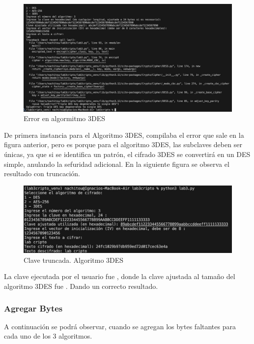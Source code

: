 \documentclass[letter,12pt]{article}
\begin{document}
\begin{figure}[H]
    \centering
    \includegraphics[width=0.9\linewidth]{imagenes/DES fallo.jpg}
    \caption{Error en algormitmo 3DES}
    \label{fig:enter-label}
\end{figure}

De primera instancia para el Algoritmo 3DES, compilaba el error que sale en la figura anterior, pero es porque para el algoritmo 3DES, las subclaves deben ser únicas, ya que si se identifica un patrón, el cifrado 3DES se convertirá en un DES simple, anulando la sefuridad adicional. En la siguiente figura se observa el resultado con truncación.


\begin{figure}[H]
    \centering
    \includegraphics[width=0.8\linewidth]{imagenes/truncado 3des.jpg}
    \caption{Clave truncada. Algoritmo 3DES}
    \label{fig:enter-label}
\end{figure}

La clave ejecutada por el usuario fue , donde la clave ajustada al tamaño del algoritmo 3DES fue . Dando un correcto resultado.


\subsubsection{Agregar Bytes}

A continuación se podrá observar, cuando se agregan los bytes faltantes para cada uno de los 3 algoritmos.
\end{document}
